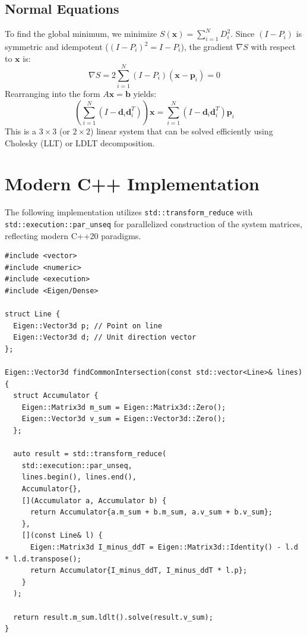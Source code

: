 \documentclass[11pt, a4paper]{article}
\begin{document}
\subsection{Normal Equations}
To find the global minimum, we minimize $S(\mathbf{x}) = \sum_{i=1}^N D_i^2$. Since $(I - P_i)$ is symmetric and idempotent ($(I-P_i)^2 = I-P_i$), the gradient $\nabla S$ with respect to $\mathbf{x}$ is:
\begin{equation}
    \nabla S = 2 \sum_{i=1}^N (I - P_i)(\mathbf{x} - \mathbf{p}_i) = 0
\end{equation}
Rearranging into the form $A\mathbf{x} = \mathbf{b}$ yields:
\begin{equation}
    \left( \sum_{i=1}^N (I - \mathbf{d}_i\mathbf{d}_i^T) \right) \mathbf{x} = \sum_{i=1}^N (I - \mathbf{d}_i\mathbf{d}_i^T) \mathbf{p}_i
\end{equation}
This is a $3 \times 3$ (or $2 \times 2$) linear system that can be solved efficiently using Cholesky (LLT) or LDLT decomposition.

\section{Modern C++ Implementation}
The following implementation utilizes \texttt{std::transform\_reduce} with \texttt{std::execution::par\_unseq} for parallelized construction of the system matrices, reflecting modern C++20 paradigms.

\begin{lstlisting}
#include <vector>
#include <numeric>
#include <execution>
#include <Eigen/Dense>

struct Line {
  Eigen::Vector3d p; // Point on line
  Eigen::Vector3d d; // Unit direction vector
};

Eigen::Vector3d findCommonIntersection(const std::vector<Line>& lines) {
  struct Accumulator {
    Eigen::Matrix3d m_sum = Eigen::Matrix3d::Zero();
    Eigen::Vector3d v_sum = Eigen::Vector3d::Zero();
  };

  auto result = std::transform_reduce(
    std::execution::par_unseq,
    lines.begin(), lines.end(),
    Accumulator{},
    [](Accumulator a, Accumulator b) {
      return Accumulator{a.m_sum + b.m_sum, a.v_sum + b.v_sum};
    },
    [](const Line& l) {
      Eigen::Matrix3d I_minus_ddT = Eigen::Matrix3d::Identity() - l.d * l.d.transpose();
      return Accumulator{I_minus_ddT, I_minus_ddT * l.p};
    }
  );

  return result.m_sum.ldlt().solve(result.v_sum);
}
\end{lstlisting}
\end{document}

